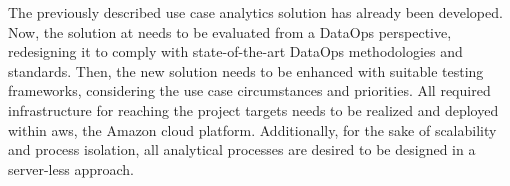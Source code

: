 The previously described use case analytics solution has already been developed. Now, the solution at needs to be evaluated from a DataOps perspective, redesigning it to comply with state-of-the-art DataOps methodologies and standards. Then, the new solution needs to be enhanced with suitable testing frameworks, considering the use case circumstances and priorities. All required infrastructure for reaching the project targets needs to be realized and deployed within \ac{aws}, the Amazon cloud platform. Additionally, for the sake of scalability and process isolation, all analytical processes are desired to be designed in a server-less approach.